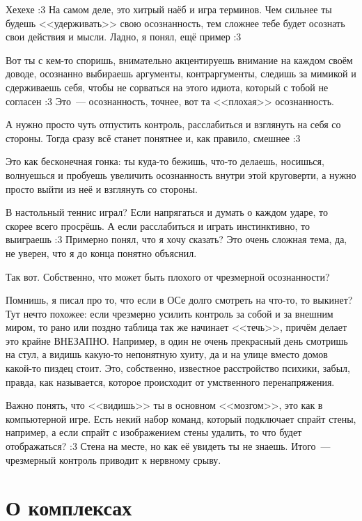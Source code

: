 \documentclass[a4paper,14pt,oneside]{memoir}
\begin{document}
\medskip
Хехехе :3 На самом деле, это хитрый наёб и игра терминов. Чем сильнее ты будешь <<удерживать>> свою осознанность, тем сложнее тебе будет осознать свои действия и мысли. 
Ладно, я понял, ещё пример :3 

Вот ты с кем-то споришь, внимательно акцентируешь внимание на каждом своём доводе, осознанно выбираешь аргументы, контраргументы, следишь за мимикой и сдерживаешь себя, чтобы не сорваться на этого идиота, который с тобой не согласен :3 Это~--- осознанность, точнее, вот та <<плохая>> осознанность.
 
А нужно просто чуть отпустить контроль, расслабиться и взглянуть на себя со стороны. Тогда сразу всё станет понятнее и, как правило, смешнее :3
 
Это как бесконечная гонка: ты куда-то бежишь, что-то делаешь, носишься, волнуешься и пробуешь увеличить осознанность внутри этой круговерти, а нужно просто выйти из неё и взглянуть со стороны. 

В настольный теннис играл? Если напрягаться и думать о каждом ударе, то скорее всего просрёшь. А если расслабиться и играть инстинктивно, то выиграешь :3 
Примерно понял, что я хочу сказать? Это очень сложная тема, да, не уверен, что я до конца понятно объяснил. 

Так вот. Собственно, что может быть плохого от чрезмерной осознанности?

Помнишь, я писал про то, что если в ОСе долго смотреть на что-то, то выкинет? Тут нечто похожее: если чрезмерно усилить контроль за собой и за внешним миром, то рано или поздно таблица так же начинает <<течь>>, причём делает это крайне ВНЕЗАПНО. Например, в один не очень прекрасный день смотришь на стул, а видишь какую-то непонятную хуиту, да и на улице вместо домов какой-то пиздец стоит. Это, собственно, известное расстройство психики, забыл, правда, как называется, которое происходит от умственного перенапряжения. 

Важно понять, что <<видишь>> ты в основном <<мозгом>>, это как в компьютерной игре. Есть некий набор команд, который подключает спрайт стены, например, а если спрайт с изображением стены удалить, то что будет отображаться? :3 Стена на месте, но как её увидеть ты не знаешь. Итого~--- чрезмерный контроль приводит к нервному срыву. 




\section{О комплексах}
\end{document}
